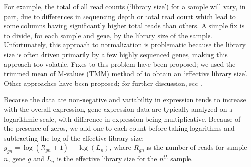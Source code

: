 {For example, the total of all read counts (`library size') for a sample will vary, in part, due to differences in sequencing depth or total read count which lead to some columns having significantly higher total reads than others. A simple fix is to divide, for each sample and gene, by the library size of the sample. Unfortunately, this approach to normalization is problematic because the library size is often driven primarily by a few highly sequenced genes, making this approach too volatile. Fixes to this problem have been proposed; we used the trimmed mean of M-values (TMM) method of \citet{robinson2010} to obtain an `effective library size'. Other approaches have been proposed; for further discussion, see \citet{oshlack2010rna}.

Because the data are non-negative and variability in expression tends to increase with the overall expression,  gene expression data are typically analyzed on a logarithmic scale, with difference in expression being multiplicative. Because of the presence of zeros, we add one to each count before taking logarithms and subtracting the log of the effective library size: $y_{gn} = \log(R_{gn}+1) - \log(L_{n})$, where $R_{gn}$ is the number of reads for sample $n$, gene $g$ and $L_{n}$ is the effective library size for the $n^{th}$ sample.

}
